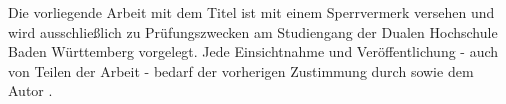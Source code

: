 
\sloppypar
Die vorliegende \abschluss Arbeit mit dem Titel \textit{\titel} ist mit einem Sperrvermerk versehen und wird ausschließlich zu Prüfungszwecken am Studiengang {\studiengang} der Dualen Hochschule Baden Württemberg {\dhbw} vorgelegt. Jede Einsichtnahme und Veröffentlichung - auch von Teilen der Arbeit - bedarf der vorherigen Zustimmung durch {\dualerPartner} sowie dem Autor {\autor}.

